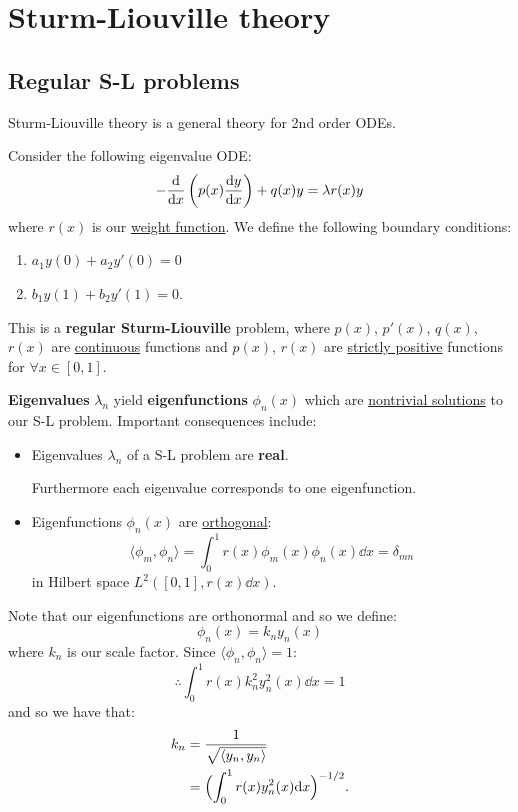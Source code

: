 \documentclass{article}
\begin{document}
\newpage

\section{Sturm-Liouville theory}

\subsection{Regular S-L problems}
Sturm-Liouville theory is a general theory for 2nd order ODEs.

Consider the following eigenvalue ODE:
$$-\dv{x}\left(p(x)\dv{y}{x}\right)+q(x)y=\lambda r(x)y$$
where $r(x)$ is our \underline{weight function}.
We define the following boundary conditions:
\begin{enumerate}
    \item $a_1 y(0)+a_2 y'(0)=0$

    \item $b_1 y(1)+b_2 y'(1)=0.$
\end{enumerate}
This is a \textbf{regular Sturm-Liouville} problem, where $p(x)$, $p'(x)$, $q(x)$, $r(x)$ are \underline{continuous} functions and $p(x)$, $r(x)$ are \underline{strictly positive} functions for $\forall x\in[0,1]$.

\textbf{Eigenvalues} $\lambda_n$ yield \textbf{eigenfunctions} $\phi_n(x)$
which are \underline{nontrivial solutions} to our S-L problem. Important consequences include:
\begin{itemize}
    \item Eigenvalues $\lambda_n$ of a S-L problem are \textbf{real}. 
    
    Furthermore each eigenvalue corresponds to one eigenfunction.

    \item Eigenfunctions $\phi_n(x)$ are \underline{orthogonal}:
    $$\langle \phi_m,\phi_n \rangle
    =\int_{0}^{1}r(x)\phi_m(x)\phi_n(x) \dd x=\delta_{mn}$$
    in Hilbert space $L^2([0,1],r(x)\dd x)$.
\end{itemize}

Note that our eigenfunctions are orthonormal and so we define:
$$\phi_n(x)=k_n y_n(x)$$
where $k_n$ is our scale factor.
Since $\langle \phi_n,\phi_n \rangle=1$:
$$\therefore\int_{0}^{1}r(x)k_n^2y_n^2(x)\dd x=1$$
and so we have that:
\begin{align*}
    k_n
    &=\frac{1}{\sqrt{\langle y_n,y_n \rangle}} \\
    &=\Bigl(\int_{0}^{1}r(x)y_n^2(x)\dd x\Bigl)^{-1/2}.
\end{align*}
\end{document}
